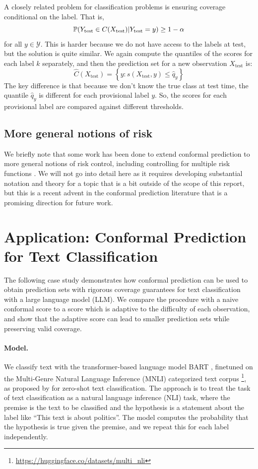 \documentclass[a4paper, 12pt]{article}
\begin{document}
A closely related problem for classification problems is ensuring coverage conditional on the label. That is,
\[ \P(Y_{\text{test}} \in C(X_{\text{test}}) | Y_{\text{test}} = y) \geq 1 - \alpha \]
for all $y \in \mathcal{Y}$. This is harder because we do not have access to the labels at test, but the solution is quite similar. We again compute the quantiles of the scores for each label $k$ separately, and then the prediction set for a new observation $X_{\text{test}}$ is:
\[ \hat{C}(X_{\text{test}}) = \left\{ y: s(X_{\text{test}}, y) \leq \hat{q}_{y} \right\} \]
The key difference is that because we don't know the true class at test time, the quantile $\hat{q}_y$ is different for each provisional label $y$. So, the scores for each provisional label are compared against different thresholds.

\subsection{More general notions of risk}
We briefly note that some work has been done to extend conformal prediction to more general notions of risk control, including controlling for multiple risk functions \autocite{angelopoulosLearnThenTest2022,batesDistributionfreeRiskcontrollingPrediction2021}. We will not go into detail here as it requires developing substantial notation and theory for a topic that is a bit outside of the scope of this report, but this is a recent advent in the conformal prediction literature that is a promising direction for future work.

\section{Application: Conformal Prediction for Text Classification}
\label{sec:application}
The following case study demonstrates how conformal prediction can be used to obtain prediction sets with rigorous coverage guarantees for text classification with a large language model (LLM). We compare the procedure with a naive conformal score to a score which is adaptive to the difficulty of each observation, and show that the adaptive score can lead to smaller prediction sets while preserving valid coverage.

\paragraph*{Model.} We classify text with the transformer-based language model BART \autocite{lewisBARTDenoisingSequencetoSequence2019},
finetuned on the Multi-Genre Natural Language Inference (MNLI) categorized text corpus \footnote{\url{https://huggingface.co/datasets/multi_nli}},
as proposed by \textcite{yinBenchmarkingZeroshotText2019} for zero-shot text classification. The approach is to treat the task of text classification as a natural language inference (NLI) task, where the premise is the text to be classified and the hypothesis is a statement about the label like ``This text is about politics''. The model computes the probability that the hypothesis is true given the premise, and we repeat this for each label independently.
\end{document}

